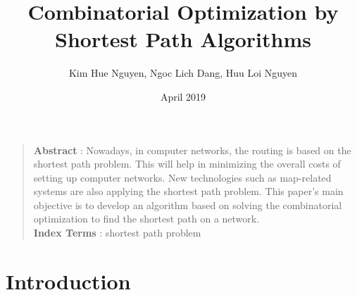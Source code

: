 \documentclass{article}
\title{Combinatorial Optimization by Shortest Path Algorithms}
\author{Kim Hue Nguyen, Ngoc Lich Dang, Huu Loi Nguyen}
\date{April 2019}
\begin{document}
\maketitle
\begin{quote}
    \textbf{Abstract} : Nowadays, in computer networks, the routing is based on the shortest path problem. This will help in minimizing the overall costs of setting up computer networks. New technologies such as map-related systems are also applying the shortest path problem. This paper’s main objective is to develop an algorithm based on solving the combinatorial optimization to find the shortest path on a network.
    \vspace{10pt}
    \\
    \textbf{Index Terms} : shortest path problem
\end{quote}

\section{Introduction}
\end{document}
